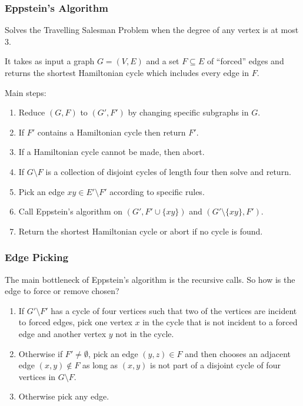 \documentclass[]{beamer}
\begin{document}
\begin{frame}
\frametitle{Eppstein's Algorithm}
Solves the Travelling Salesman Problem when the degree of any vertex is at most $3$.

It takes as input a graph $G = (V, E)$ and a set $F \subseteq E$ of ``forced'' edges and returns the shortest Hamiltonian cycle which includes every edge in $F$.

Main steps:
\begin{enumerate}
\item Reduce $(G, F)$ to $(G', F')$ by changing specific subgraphs in $G$.
\item If $F'$ contains a Hamiltonian cycle then return $F'$.
\item If a Hamiltonian cycle cannot be made, then abort.
\item If $G \setminus F$ is a collection of disjoint cycles of length four then solve and return.
\item Pick an edge $xy \in E' \setminus F'$ according to specific rules.
\item Call Eppstein's algorithm on $(G', F' \cup \{xy\})$ and $(G' \setminus \{xy\}, F')$.
\item Return the shortest Hamiltonian cycle or abort if no cycle is found.
\end{enumerate}
\end{frame}

\begin{frame}
\frametitle{Edge Picking}
The main bottleneck of Eppstein's algorithm is the recursive calls. So how is the edge to force or remove chosen?

\begin{enumerate}
\item If $G' \setminus F'$ has a cycle of four vertices such that two of the vertices are incident to forced edges, pick one vertex $x$ in the cycle that is not incident to a forced edge and another vertex $y$ not in the cycle.
\item Otherwise if $F' \neq \emptyset$, pick an edge $(y, z) \in F$ and then chooses an adjacent edge $(x, y) \notin F$ as long as $(x, y)$ is not part of a disjoint cycle of four vertices in $G \setminus F$.
\item Otherwise pick any edge.
\end{enumerate}

\end{frame}
\end{document}
